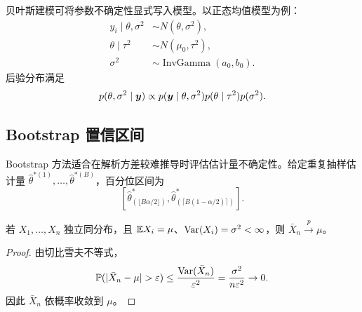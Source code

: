 贝叶斯建模可将参数不确定性显式写入模型。以正态均值模型为例：
\begin{align}
  y_i\mid \theta,\sigma^2 &\sim N(\theta,\sigma^2),\\
  \theta\mid \tau^2 &\sim N(\mu_0,\tau^2),\\
  \sigma^2 &\sim \operatorname{InvGamma}(a_0,b_0).
\end{align}
后验分布满足
\begin{equation}
  p(\theta,\sigma^2\mid \bm{y})
  \propto p(\bm{y}\mid \theta,\sigma^2)p(\theta\mid\tau^2)p(\sigma^2).
\end{equation}

\subsection{Bootstrap 置信区间}

Bootstrap 方法适合在解析方差较难推导时评估估计量不确定性。给定重复抽样估计量
\(\hat{\theta}^{*(1)},\ldots,\hat{\theta}^{*(B)}\)，百分位区间为
\begin{equation}
  \left[
    \hat{\theta}^{*}_{(\lfloor B\alpha/2\rfloor)},
    \hat{\theta}^{*}_{(\lceil B(1-\alpha/2)\rceil)}
  \right].
\end{equation}

\begin{theorem}[样本均值的一致性]
若 \(X_1,\ldots,X_n\) 独立同分布，且 \(\mathbb{E} X_i=\mu\)、\(\operatorname{Var}(X_i)=\sigma^2<\infty\)，则 \(\bar{X}_n\overset{p}{\to}\mu\)。
\end{theorem}

\begin{proof}
由切比雪夫不等式，
\[
  \Prob(|\bar{X}_n-\mu|>\varepsilon)
  \le \frac{\Var(\bar{X}_n)}{\varepsilon^2}
  =\frac{\sigma^2}{n\varepsilon^2}\to 0.
\]
因此 \(\bar{X}_n\) 依概率收敛到 \(\mu\)。
\end{proof}
